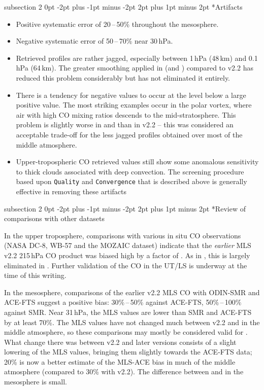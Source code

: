 \documentclass[11pt,draft]{report}
\makeatletter
\renewcommand{\subsection}{\@startsection%
  {subsection}%
  {2}%
  {0pt}%
  {-2pt plus -1pt minus -2pt}%
  {2pt plus 1pt minus 2pt}%
  {\large\sffamily\fontseries{sb}\selectfont\flushleft\color{SectionColor}\figureversion{tabular}}}%
\providecommand{\DIFaddtex}[1]{{\protect\color{blue}\uwave{#1}}} %
\providecommand{\DIFaddbegin}{} %
\providecommand{\DIFaddend}{} %
\providecommand{\DIFadd}[1]{\texorpdfstring{\DIFaddtex{#1}}{#1}} %
\makeatother
\begin{document}
\subsection*{Artifacts}
\begin{itemize}
\item Positive systematic error of 20\,--\,50\% throughout the mesosphere.
\item Negative systematic error of 50\,--\,70\% near 30\,hPa.
\item Retrieved profiles are rather jagged, especially between 1\,hPa
  (48\,km) and 0.1\,hPa (64\,km). The greater smoothing applied in
  \thisv (and \prevvSlash) compared to v2.2 has reduced this problem
  considerably but has not eliminated it entirely.
\item There is a tendency for negative values to occur at the level
  below a large positive value. The most striking examples occur in the
  polar vortex, where air with high CO mixing ratios descends to the
  mid-stratosphere.  This problem is slightly worse in \thisv and
  \prevvSlash than in v2.2 -- this was considered an acceptable
  trade-off for the less jagged profiles obtained over most of the
  middle atmosphere.
\item Upper-tropospheric \thisv CO retrieved values still show some anomalous 
sensitivity to thick clouds associated with deep convection.  
The screening procedure based upon \texttt{Quality} and \texttt{Convergence} 
that is described above is generally effective in removing these artifacts\DIFaddbegin \DIFadd{.
}\DIFaddend \end{itemize}

\subsection*{Review of comparisons with other datasets}

In the upper troposphere, comparisons with various in situ CO
observations (NASA DC-8, WB-57 and the MOZAIC dataset) indicate that the
\emph{earlier} MLS v2.2 215\,hPa CO product was biased high by a factor
of . As in \prevv, this is largely eliminated in \thisv.
Further validation of the \thisv CO in the UT/LS is underway at the time
of this writing.

In the mesosphere, comparisons of the earlier v2.2 MLS CO with ODIN-SMR
and ACE-FTS suggest a positive bias: 30\%\,--\,50\% against ACE-FTS,
50\%\,--\,100\% against SMR. Near 31\,hPa, the MLS values are lower than
SMR and ACE-FTS by at least 70\%. The MLS values have not changed much
between v2.2 and \thisv in the middle atmosphere, so these comparisons
may mostly be considered valid for \thisv.  What change there was
between v2.2 and later versions consists of a slight lowering of the MLS
values, bringing them slightly towards the ACE-FTS data; 20\% is now a
better estimate of the MLS-ACE bias in much of the middle atmosphere
(compared to 30\% with v2.2). The difference between \prevvSlash and
\thisv in the mesosphere is small.
\end{document}
